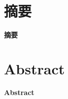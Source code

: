 \documentclass{ctexart}
\makeatletter
\newenvironment{chineseabstract}{%
  \if@twocolumn
  \section*{摘要}
  \else
  \small
  \begin{center}
    {\bfseries 摘要\vspace{-.5em}\vspace{\z@}}
  \end{center}
  \quotation
  \fi}{%
  \if@twocolumn\else\endquotation\fi}
\newenvironment{englishabstract}{%
  \if@twocolumn
  \section*{Abstract}
  \else
  \small
  \begin{center}
    {\bfseries Abstract\vspace{-.5em}\vspace{\z@}}
  \end{center}
  \quotation
  \fi}{%
  \if@twocolumn\else\endquotation\fi}
\makeatother
\begin{document}
  \begin{chineseabstract}
    \zhlipsum[1]
  \end{chineseabstract}
  \begin{englishabstract}
    \lipsum[1]
  \end{englishabstract}
\end{document}
